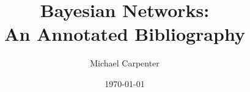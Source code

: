 \documentclass{article}
\title{Bayesian Networks: \\ An Annotated Bibliography}
\author{Michael Carpenter}
\date{\today}
\begin{document}
\maketitle

\cite{Pearl94}
\cite{Chickering95}
\cite{HeckermanGC95}
\cite{FriedmanG96}
\cite{FriedmanGG97}
\cite{FriedmanLNP00}
\cite{murphy02}
\cite{Heckerman08}



\end{document}
